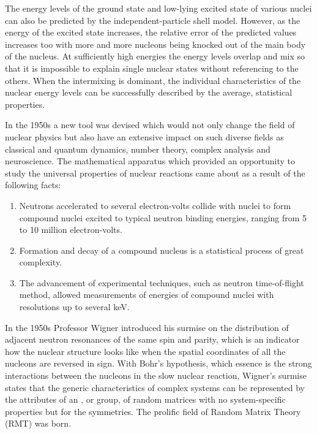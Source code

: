 The energy levels of the ground state and low-lying excited state of various nuclei can also be predicted by the independent-particle shell model.\cite{mayer55} However, as the energy of the excited state increases, the relative error of the predicted values increases too with more and more nucleons being knocked out of the main body of the nucleus. At sufficiently high energies the energy levels overlap and mix so that it is impossible to explain single nuclear states without referencing to the others. When the intermixing is dominant, the individual characteristics of the nuclear energy levels can be successfully described by the average, statistical properties. \cite{mehta}

In the 1950s a new tool was devised which would not only change the field of nuclear physics but also have an extensive impact on such diverse fields as classical and quantum dynamics\cites{berry358}{gut}, number theory, complex analysis\cite{cart} and neuroscience\cite{wain13}.  The mathematical apparatus which provided an opportunity to study the universal properties of nuclear reactions came about as a result of the following facts\cite{firk}:
\begin{enumerate}
\item Neutrons accelerated to several electron-volts collide with nuclei to form compound nuclei excited to typical neutron binding energies, ranging from 5 to 10 million electron-volts.
\item Formation and decay of a compound nucleus is a statistical process of great complexity.
\item The advancement of experimental techniques, such as neutron time-of-flight method\cite{firk79}, allowed measurements of energies of compound nuclei with resolutions up to several keV.
\end{enumerate}
In the 1950s Professor Wigner introduced his surmise on the distribution of adjacent neutron resonances of the same spin and parity, which is an indicator how the nuclear structure looks like when the spatial coordinates of all the nucleons are reversed in sign. With Bohr's hypothesis, which essence is the strong interactions between the nucleons in the slow nuclear reaction, Wigner's surmise states that the generic characteristics of complex systems can be represented by the attributes of an , or group, of random matrices with no system-specific properties but for the symmetries.\cite{wig67} The prolific field of Random Matrix Theory (RMT) was born.
